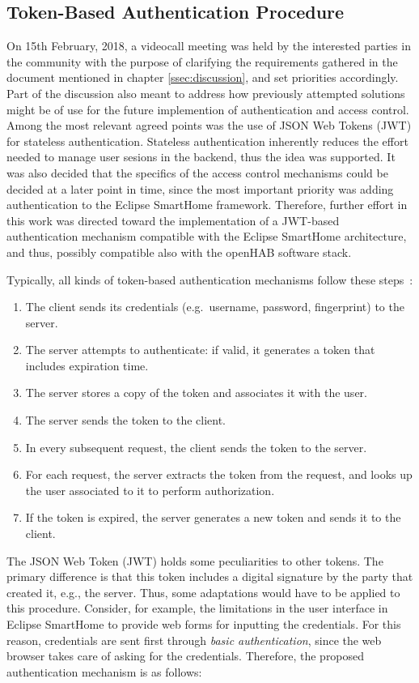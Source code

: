 \documentclass[12pt]{article}
\begin{document}
\subsection{Token-Based Authentication Procedure}

On 15th February, 2018, a videocall meeting was held by the interested parties in the community with the purpose of clarifying the requirements gathered in the document mentioned in chapter \ref{ssec:discussion}, and set priorities accordingly. Part of the discussion also meant to address how previously attempted solutions might be of use for the future implemention of authentication and access control. Among the most relevant agreed points was the use of JSON Web Tokens (JWT) for stateless authentication. Stateless authentication inherently reduces the effort needed to manage user sesions in the backend, thus the idea was supported. It was also decided that the specifics of the access control mechanisms could be decided at a later point in time, since the most important priority was adding authentication to the Eclipse SmartHome framework. Therefore, further effort in this work was directed toward the implementation of a JWT-based authentication mechanism compatible with the Eclipse SmartHome architecture, and thus, possibly compatible also with the openHAB software stack.

Typically, all kinds of token-based authentication mechanisms follow these steps~\cite{token_auth}:
\begin{enumerate}
\item The client sends its credentials (e.g.\ username, password, fingerprint) to the server.
\item The server attempts to authenticate: if valid, it generates a token that includes expiration time.
\item The server stores a copy of the token and associates it with the user.
\item The server sends the token to the client.
\item In every subsequent request, the client sends the token to the server.
\item For each request, the server extracts the token from the request, and looks up the user associated to it to perform authorization.
\item If the token is expired, the server generates a new token and sends it to the client. 
\end{enumerate}

The JSON Web Token (JWT) holds some peculiarities to other tokens. The primary difference is that this token includes a digital signature by the party that created it, e.g., the server. Thus, some adaptations would have to be applied to this procedure. Consider, for example, the limitations in the user interface in Eclipse SmartHome to provide web forms for inputting the credentials. For this reason, credentials are sent first through \emph{basic authentication}, since the web browser takes care of asking for the credentials. Therefore, the proposed authentication mechanism is as follows:
\end{document}
